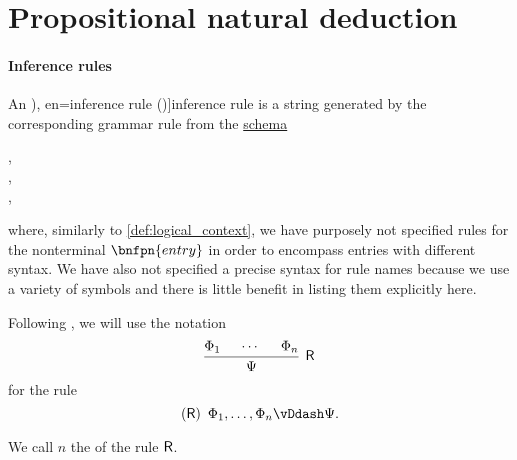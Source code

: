 \section{Propositional natural deduction}\label{sec:propositional_natural_deduction}

\paragraph{Inference rules}

\begin{definition}\label{def:inference_rule}\mimprovised
  An \term[ru=правило вывода (\cite[31]{Герасимов2011Вычислимость}), en=inference rule (\cite[2]{MartinLöf1996LogicalLaws})]{inference rule} is a string generated by the corresponding grammar rule from the \hyperref[def:formal_grammar/schema]{schema}
  \begin{bnf*}
         { \bnfor {} \bnfsp \bnftsq{,} \bnfsp {}}, \\
           {\bnfves \bnfor {}}, \\
         {}, \\
     {\bnftsq{(} \bnfsp {} \bnfsp \bnftsq{)} \bnfsp {} \bnfsp \bnftsq{\( \vDdash \)} \bnfsp {}}
  \end{bnf*}
  where, similarly to \cref{def:logical_context}, we have purposely not specified rules for the nonterminal \( \bnfpn{entry} \) in order to encompass entries with different syntax. We have also not specified a precise syntax for rule names because we use a variety of symbols and there is little benefit in listing them explicitly here.

  Following , we will use the notation
  \begin{equation*}
    \begin{prooftree}
      \hypo{ \Phi_1 }
      \hypo{ \cdots }
      \hypo{ \Phi_n }
      \infer3[\logic{R}]{ \Psi }
    \end{prooftree}
  \end{equation*}
  for the rule
  \begin{equation*}
    (\logic{R}) \enspace \Phi_1, \ldots, \Phi_n \vDdash \Psi.
  \end{equation*}

  We call \( n \) the  of the rule \( \textsf{\upshape R} \).
\end{definition}
